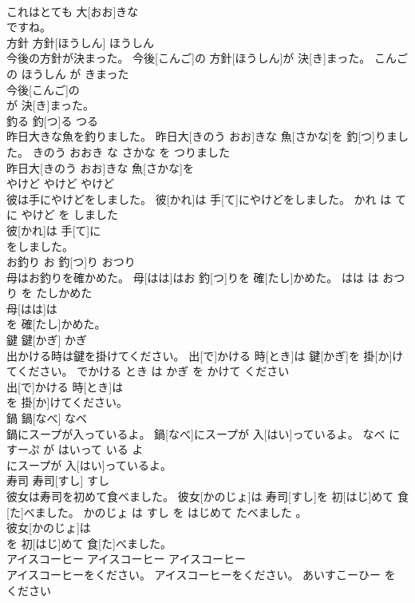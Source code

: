 \documentclass[8pt]{extreport}
\begin{document}
\begin{CJK}{UTF8}{min}
\\	これはとても 大[おお]きな
\\	ですね。			
\\	方針	方針[ほうしん]	ほうしん	
\\	今後の方針が決まった。	今後[こんご]の 方針[ほうしん]が 決[き]まった。	こんご の ほうしん が きまった	
\\	今後[こんご]の
\\	が 決[き]まった。			
\\	釣る	釣[つ]る	つる	
\\	昨日大きな魚を釣りました。	昨日大[きのう おお]きな 魚[さかな]を 釣[つ]りました。	きのう おおき な さかな を つりました	
\\	昨日大[きのう おお]きな 魚[さかな]を
\\	やけど	やけど	やけど	
\\	彼は手にやけどをしました。	彼[かれ]は 手[て]にやけどをしました。	かれ は て に やけど を しました	
\\	彼[かれ]は 手[て]に
\\	をしました。			
\\	お釣り	お 釣[つ]り	おつり	
\\	母はお釣りを確かめた。	母[はは]はお 釣[つ]りを 確[たし]かめた。	はは は おつり を たしかめた	
\\	母[はは]は
\\	を 確[たし]かめた。			
\\	鍵	鍵[かぎ]	かぎ	
\\	出かける時は鍵を掛けてください。	出[で]かける 時[とき]は 鍵[かぎ]を 掛[か]けてください。	でかける とき は かぎ を かけて ください	
\\	出[で]かける 時[とき]は
\\	を 掛[か]けてください。			
\\	鍋	鍋[なべ]	なべ	
\\	鍋にスープが入っているよ。	鍋[なべ]にスープが 入[はい]っているよ。	なべ に すーぷ が はいって いる よ	
\\	にスープが 入[はい]っているよ。			
\\	寿司	寿司[すし]	すし	
\\	彼女は寿司を初めて食べました。	彼女[かのじょ]は 寿司[すし]を 初[はじ]めて 食[た]べました。	かのじょ は すし を はじめて たべました 。	
\\	彼女[かのじょ]は
\\	を 初[はじ]めて 食[た]べました。			
\\	アイスコーヒー	アイスコーヒー	アイスコーヒー	
\\	アイスコーヒーをください。	アイスコーヒーをください。	あいすこーひー を ください	

\end{CJK}
\end{document}
